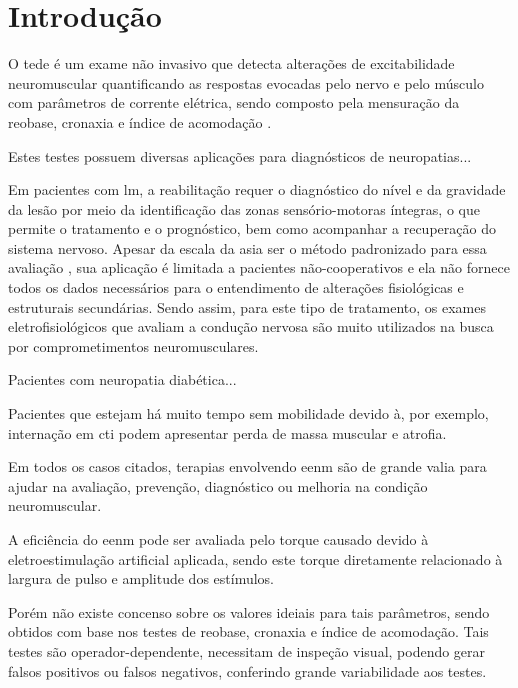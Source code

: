 \documentclass[a4paper,10pt]{article}
\title{}
\author{}
\date{}
\begin{document}
\maketitle



\section{Introdução}

O \ac{tede} é um exame não invasivo que detecta alterações de excitabilidade neuromuscular quantificando as respostas evocadas pelo nervo e pelo músculo com parâmetros de corrente elétrica, sendo composto pela mensuração da reobase, cronaxia e índice de acomodação \cite{sluga2002,schuhfired2005,lee2013}.

Estes testes possuem diversas aplicações para diagnósticos de neuropatias...

Em pacientes com \ac{lm}, a reabilitação requer o diagnóstico do nível e da gravidade da lesão por meio da identificação das zonas sensório-motoras íntegras, o que permite o tratamento e o prognóstico, bem como acompanhar a recuperação do sistema nervoso. Apesar da escala da \ac{asia} ser o método padronizado para essa avaliação \cite{van2011}, sua aplicação é limitada a pacientes não-cooperativos e ela não fornece todos os dados necessários para o entendimento de alterações fisiológicas e estruturais secundárias. Sendo assim, para este tipo de tratamento, os exames eletrofisiológicos que avaliam a condução nervosa são muito utilizados na busca por comprometimentos neuromusculares.

Pacientes com neuropatia diabética...

Pacientes que estejam há muito tempo sem mobilidade devido à, por exemplo, internação em \ac{cti} podem apresentar perda de massa muscular e atrofia.

Em todos os casos citados, terapias envolvendo \ac{eenm} são de grande valia para ajudar na avaliação, prevenção, diagnóstico ou melhoria na condição neuromuscular.

A eficiência do \ac{eenm} pode ser avaliada pelo torque causado devido à eletroestimulação artificial aplicada, sendo este torque diretamente relacionado à largura de pulso e amplitude dos estímulos.

Porém não existe concenso sobre os valores ideiais para tais parâmetros, sendo obtidos com base nos testes de reobase, cronaxia e índice de acomodação. Tais testes são operador-dependente, necessitam de inspeção visual, podendo gerar falsos positivos ou falsos negativos, conferindo grande variabilidade aos testes.
\end{document}
